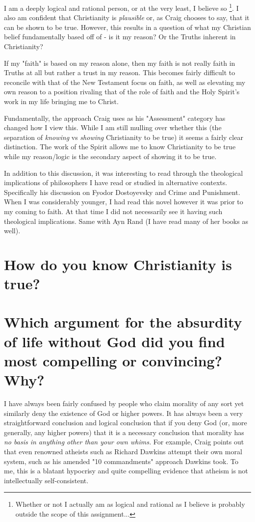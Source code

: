 I am a deeply logical and rational person, or at the very least, I believe so \footnote{Whether or not I actually am as logical and rational as I believe is probably outside the scope of this assignment...}. I also am confident that Christianity is \textit{plausible} or, as Craig chooses to say, that it can be shown to be true. However, this results in a question of what my Christian belief fundamentally based off of - is it my reason? Or the Truths inherent in Christianity?

If my "faith" is based on my reason alone, then my faith is not really faith in Truths at all but rather a trust in my reason. This becomes fairly difficult to reconcile with that of the New Testament focus on faith, as well as elevating my own reason to a position rivaling that of the role of faith and the Holy Spirit's work in my life bringing me to Christ.

Fundamentally, the approach Craig uses as his "Assessment" \autocite[pg.8]{craig2008reasonable} category has changed how I view this. While I am still mulling over whether this (the separation of \textit{knowing} vs \textit{showing} Christianity to be true) it seems a fairly clear distinction. The work of the Spirit allows me to know Christianity to be true while my reason/logic is the secondary aspect of showing it to be true.

In addition to this discussion, it was interesting to read through the theological implications of philosophers I have read or studied in alternative contexts. Specifically his discussion on Fyodor Dostoyevsky\autocite[pg.68]{craig2008reasonable} and Crime and Punishment. When I was considerably younger, I had read this novel however it was prior to my coming to faith. At that time I did not necessarily see it having such theological implications. Same with Ayn Rand (I have read many of her books as well).




\section*{How do you know Christianity is true?}
\section{Which argument for the absurdity of life without God did you find most compelling or convincing? Why?}
I have always been fairly confused by people who claim morality of any sort yet similarly deny the existence of God or higher powers.  It has always been a very straightforward conclusion and logical conclusion that if you deny God (or, more generally, any higher powers) that it is a necessary conclusion that morality has \textit{no basis in anything other than your own whims.} For example, Craig points out that even renowned atheists such as Richard Dawkins attempt their own moral system, such as his amended "10 commandments"\autocite[pg.81]{craig2008reasonable} approach Dawkins took. To me, this is a blatant hypocrisy and quite compelling evidence that atheism is not intellectually self-consistent.

